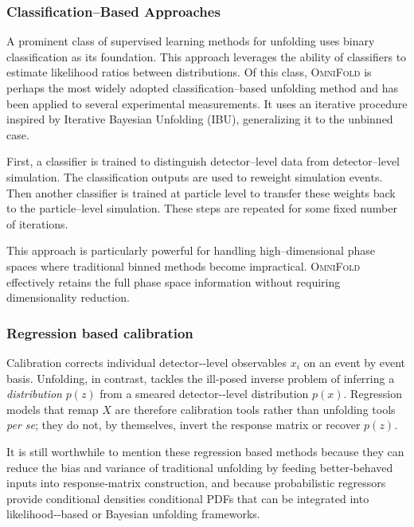         \subsubsection{Classification--Based Approaches}
            A prominent class of supervised learning methods for unfolding uses binary classification as its foundation.
            This approach leverages the ability of classifiers to estimate likelihood ratios between distributions.
            Of this class, \textsc{OmniFold} is perhaps the most widely adopted classification--based unfolding method and has been applied to several experimental measurements.
            It uses an iterative procedure inspired by Iterative Bayesian Unfolding (IBU), generalizing it to the unbinned case.

            First, a classifier is trained to distinguish detector--level data from detector--level simulation.
            The classification outputs are used to reweight simulation events.
            Then another classifier is trained at particle level to transfer these weights back to the particle--level simulation.
            These steps are repeated for some fixed number of iterations.

            This approach is particularly powerful for handling high--dimensional phase spaces where traditional binned methods become impractical.
            \textsc{OmniFold} effectively retains the full phase space information without requiring dimensionality reduction.
        \subsubsection{Regression based calibration}
        \label{subsubsec:regression_calibration}
            Calibration corrects individual detector‐-level observables $x_i$ on an event by event basis.
            Unfolding, in contrast, tackles the ill‐posed inverse problem of inferring a \emph{distribution} $p(z)$ from a smeared detector-‐level distribution $p(x)$.
            Regression models that remap \(X\) are therefore calibration tools rather than unfolding tools \textit{per se}; they do not, by themselves, invert the response matrix or recover $p(z)$.
            
            It is still worthwhile to mention these regression based methods because they can reduce the bias and variance of traditional unfolding by feeding better‐behaved inputs into response‐matrix construction, and because probabilistic regressors provide conditional densities conditional PDFs that can be integrated into likelihood-‐based or Bayesian unfolding frameworks.
